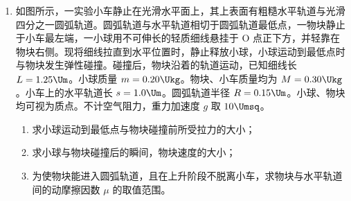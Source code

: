 \documentclass[\gkver]{gaokaozhenti}
\begin{document}
\begin{enumerate}

\item
如图所示，一实验小车静止在光滑水平面上，其上表面有粗糙水平轨道与光滑四分之一圆弧轨道。圆弧轨道与水平轨道相切于圆弧轨道最低点，一物块静止于小车最左端，一小球用不可伸长的轻质细线悬挂于 O 点正下方，并轻靠在物块右侧。现将细线拉直到水平位置时，静止释放小球，小球运动到最低点时与物块发生弹性碰撞。碰撞后，物块沿着的轨道运动，已知细线长 $L = 1.25 \Um$。小球质量 $m = 0.20 \Ukg$。物块、小车质量均为 $M = 0.30 \Ukg$。小车上的水平轨道长 $s = 1.0 \Um$。圆弧轨道半径 $R = 0.15 \Um$。小球、物块均可视为质点。不计空气阻力，重力加速度 $g$ 取 $10 \Umsq$。
\begin{enumerate}
	\item
	求小球运动到最低点与物块碰撞前所受拉力的大小；
	\item
	求小球与物块碰撞后的瞬间，物块速度的大小；
	\item
	为使物块能进入圆弧轨道，且在上升阶段不脱离小车，求物块与水平轨道间的动摩擦因数 $\mu$ 的取值范围。
\end{enumerate}

\jdanswer{
\begin{enumerate}
	\item
	$6 \UN$

	\item
	$4 \Ums$


\end{enumerate}}
\end{enumerate}
\end{document}
